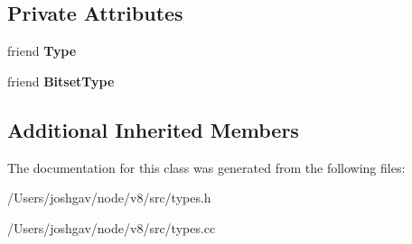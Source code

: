 \subsection*{Private Attributes}
\begin{DoxyCompactItemize}
\item 
friend {\bfseries Type}\hypertarget{classv8_1_1internal_1_1_union_type_a3ee080ab132cb4cda8b5bf32644c9a7e}{}\label{classv8_1_1internal_1_1_union_type_a3ee080ab132cb4cda8b5bf32644c9a7e}

\item 
friend {\bfseries Bitset\+Type}\hypertarget{classv8_1_1internal_1_1_union_type_a25f71d17226735ddefd6938f421df7aa}{}\label{classv8_1_1internal_1_1_union_type_a25f71d17226735ddefd6938f421df7aa}

\end{DoxyCompactItemize}
\subsection*{Additional Inherited Members}


The documentation for this class was generated from the following files\+:\begin{DoxyCompactItemize}
\item 
/\+Users/joshgav/node/v8/src/types.\+h\item 
/\+Users/joshgav/node/v8/src/types.\+cc\end{DoxyCompactItemize}
